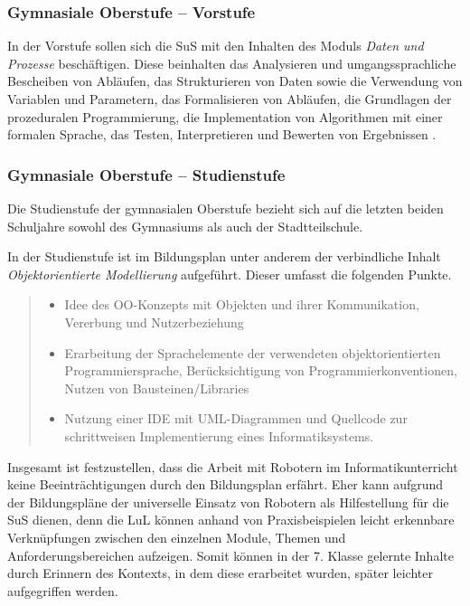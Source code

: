 \documentclass[paper=a4, DIV=calc, BCOR=12mm, twoside=on, onecolumn=on, open = right, titlepage =on, parskip =half-, headsepline = on, footsepline = off, chapterprefix = off, appendixprefix = on, fontsize = 12pt, numbers = noenddot, abstract = on]{scrbook}
\begin{document}
\vspace*{-1ex}
\subsubsection{Gymnasiale Oberstufe -- Vorstufe}

In der Vorstufe sollen sich die SuS mit den Inhalten des Moduls \emph{Daten und Prozesse} beschäftigen. Diese beinhalten das Analysieren und umgangssprachliche Bescheiben von Abläufen, das Strukturieren von Daten sowie die Verwendung von Variablen und Parametern, das Formalisieren von Abläufen, die Grundlagen der prozeduralen Programmierung, die Implementation von Algorithmen mit einer formalen Sprache, das Testen, Interpretieren und Bewerten von Ergebnissen \cite{oberstufe:09}. 
\vspace*{-1ex}
\subsubsection{Gymnasiale Oberstufe -- Studienstufe}
Die Studienstufe der gymnasialen Oberstufe bezieht sich auf die letzten beiden Schuljahre sowohl des Gymnasiums als auch der Stadtteilschule.

In der Studienstufe ist im Bildungsplan unter anderem der verbindliche Inhalt \emph{Objektorientierte Modellierung} aufgeführt. Dieser umfasst die folgenden Punkte.
\begin{quote}
\begin{itemize}
\item Idee des OO-Konzepts mit Objekten und ihrer Kommunikation, Vererbung und Nutzerbeziehung
\item Erarbeitung der Sprachelemente der verwendeten objektorientierten Programmiersprache, Berücksichtigung von Programmierkonventionen, Nutzen von Bausteinen/Libraries
\item Nutzung einer IDE mit UML-Diagrammen und Quellcode zur schrittweisen Implementierung eines Informatiksystems. \qquad \cite{oberstufe:09}
\end{itemize}
\end{quote}

\vspace*{2ex}
Insgesamt ist festzustellen, dass die Arbeit mit Robotern im Informatikunterricht keine Beeinträchtigungen durch den Bildungsplan erfährt. Eher kann aufgrund der Bildungspläne der universelle Einsatz von Robotern als Hilfestellung für die SuS dienen, denn die LuL können anhand von Praxisbeispielen leicht erkennbare Verknüpfungen zwischen den einzelnen Module, Themen und Anforderungsbereichen aufzeigen. Somit können in der 7. Klasse gelernte Inhalte durch Erinnern des Kontexts, in dem diese erarbeitet wurden, später leichter aufgegriffen werden.
\end{document}
